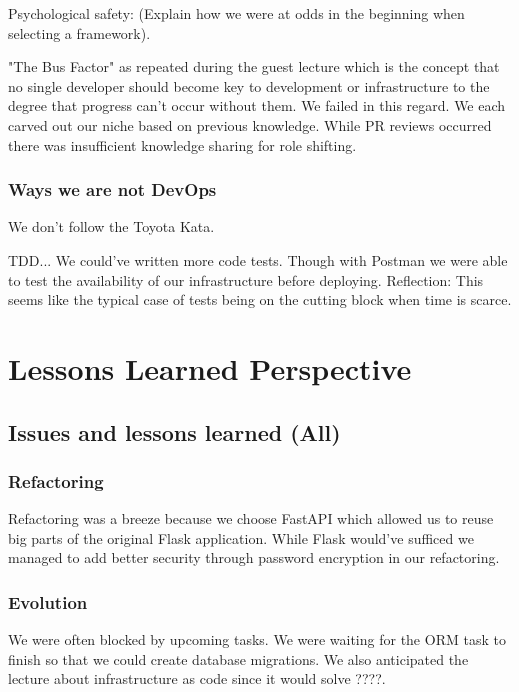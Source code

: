 \documentclass{article}
\begin{document}
{Psychological safety: (Explain how we were at odds in the beginning when selecting a framework). 

"The Bus Factor" as repeated during the guest lecture which is the concept that no single developer should become key to development or infrastructure to the degree that progress can't occur without them. We failed in this regard. We each carved out our niche based on previous knowledge. While PR reviews occurred there was insufficient knowledge sharing for role shifting. 

\subsubsection{Ways we are not DevOps}

We don't follow the Toyota Kata. 

TDD... We could've written more code tests. Though with Postman we were able to test the availability of our infrastructure before deploying. Reflection: This seems like the typical case of tests being on the cutting block when time is scarce. 


\section{Lessons Learned Perspective}

\subsection{Issues and lessons learned (All)}


\subsubsection{Refactoring} 

Refactoring was a breeze because we choose FastAPI which allowed us to reuse big parts of the original Flask application. While Flask would've sufficed we managed to add better security through password encryption in our refactoring. 

\subsubsection{Evolution}

We were often blocked by upcoming tasks. We were waiting for the ORM task to finish so that we could create database migrations. We also anticipated the lecture about infrastructure as code since it would solve ????.

}
\end{document}
